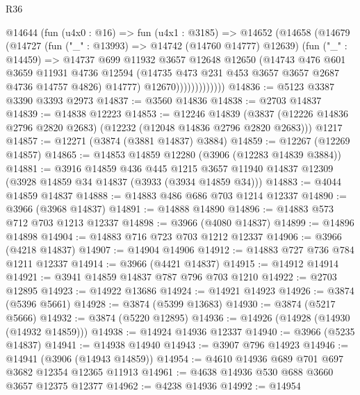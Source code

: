 \begin{lexlean}{R36}
\begin{coremodule}
                  @14644
                    (fun (u4x0 : @16) =>
                    fun (u4x1 : @3185) =>
                    @14652
                      (@14658
                        (@14679
                          (@14727
                            (fun ("_" : @13993) => @14742 (@14760 @14777) @12639)
                            (fun ("_" : @14459) =>
                            @14737
                              @699
                              @11932
                              @3657
                              @12648
                              @12650
                              (@14743
                                @476
                                @601
                                @3659
                                @11931
                                @4736
                                @12594
                                (@14735 @473 @231 @453 @3657 @3657 @2687 @4736 @14757 @4826)
                                @14777)
                              @12670)))))))))))))
@14836 := @5123 @3387 @3390 @3393 @2973
@14837 := @3560 @14836
@14838 := @2703 @14837
@14839 := @14838 @12223
@14853 := @12246
    @14839
    (@3837 (@12226 @14836 @2796 @2820 @2683) (@12232 (@12048 @14836 @2796 @2820 @2683)))
    @1217
@14857 := @12271 (@3874 (@3881 @14837) @3884)
@14859 := @12267 (@12269 @14857)
@14865 := @14853 @14859 @12280 (@3906 (@12283 @14839 @3884))
@14881 := @3916
    @14859
    @436
    @445
    @1215
    @3657
    @11940
    @14837
    @12309
    (@3928 @14859 @34 @14837 (@3933 (@3934 @14859 @34)))
@14883 := @4044 @14859 @14837
@14888 := @14883 @486 @686 @703 @1214 @12337
@14890 := @3966 (@3968 @14837)
@14891 := @14888 @14890
@14896 := @14883 @573 @712 @703 @1213 @12337
@14898 := @3966 (@4080 @14837)
@14899 := @14896 @14898
@14904 := @14883 @716 @723 @703 @1212 @12337
@14906 := @3966 (@4218 @14837)
@14907 := @14904 @14906
@14912 := @14883 @727 @736 @784 @1211 @12337
@14914 := @3966 (@4421 @14837)
@14915 := @14912 @14914
@14921 := @3941 @14859 @14837 @787 @796 @703 @1210
@14922 := @2703 @12895
@14923 := @14922 @13686
@14924 := @14921 @14923
@14926 := @3874 (@5396 @5661)
@14928 := @3874 (@5399 @13683)
@14930 := @3874 (@5217 @5666)
@14932 := @3874 (@5220 @12895)
@14936 := @14926 (@14928 (@14930 (@14932 @14859)))
@14938 := @14924 @14936 @12337
@14940 := @3966 (@5235 @14837)
@14941 := @14938 @14940
@14943 := @3907 @796 @14923
@14946 := @14941 (@3906 (@14943 @14859))
@14954 := @4610 @14936 @689 @701 @697 @3682 @12354 @12365 @11913
@14961 := @4638 @14936 @530 @688 @3660 @3657 @12375 @12377
@14962 := @4238 @14936
@14992 := @14954

\end{coremodule}
\end{lexlean}
